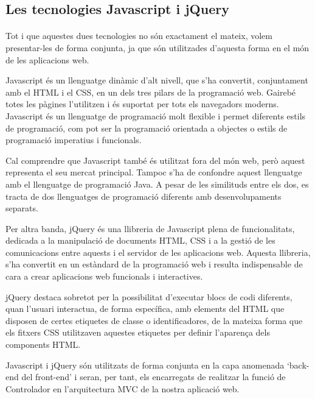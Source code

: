 \subsection{Les tecnologies Javascript i jQuery}

    \paragraph{}
    Tot i que aquestes dues tecnologies no són exactament el mateix, volem presentar-les de forma conjunta, ja que són utilitzades d’aquesta forma en el món de les aplicacions web.

    Javascript és un llenguatge dinàmic d'alt nivell, que s'ha convertit, conjuntament amb el HTML i el CSS, en un dels tres pilars de la programació web. Gairebé totes les pàgines l'utilitzen i és suportat per tots els navegadors moderns. Javascript és un llenguatge de programació molt flexible i permet diferents estils de programació, com pot ser la programació orientada a objectes o estils de programació imperatius i funcionals.

    Cal comprendre que Javascript també és utilitzat fora del món web, però aquest  representa el seu mercat principal. Tampoc s'ha de confondre aquest llenguatge amb el llenguatge de programació Java. A pesar de les similituds entre els dos, es tracta de dos llenguatges de programació diferents amb desenvolupaments separats.

    Per altra banda, jQuery és una llibreria de Javascript plena de funcionalitats, dedicada a la manipulació de documents HTML, CSS i a la gestió de les comunicacions entre aquests i el servidor de les aplicacions web. Aquesta llibreria, s'ha convertit en un estàndard de la programació web i resulta indispensable de cara a crear aplicacions web funcionals i interactives.

    jQuery destaca sobretot per la possibilitat d’executar blocs de codi diferents, quan l’usuari interactua, de forma específica, amb elements del HTML que disposen de certes etiquetes de classe o identificadores, de la mateixa forma que els fitxers CSS utilitzaven aquestes etiquetes per definir l’aparença dels components HTML.

    Javascript i jQuery són utilitzats de forma conjunta en la capa anomenada `back-end del front-end’ i seran, per tant, els encarregats de realitzar la funció de Controlador en l'arquitectura MVC de la nostra aplicació web.

